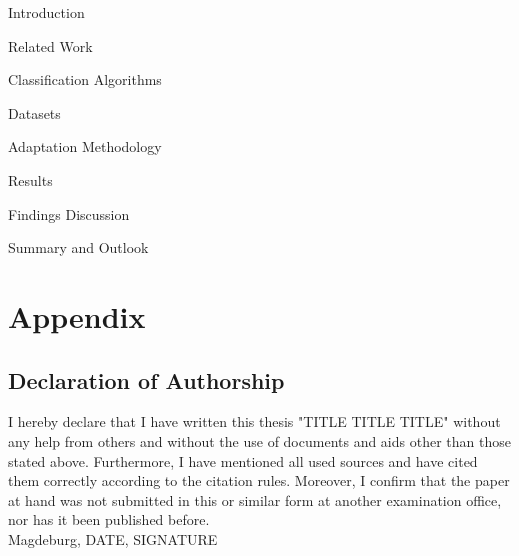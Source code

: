 \renewcommand*\contentsname{Table of Contents}
\tableofcontents
\thispagestyle{empty}
 
 \null\newpage
{} 






\thispagestyle{empty}
\null\newpage
{}
{Introduction}
\null\newpage

{Related Work}
\null\newpage

{Classification Algorithms}
\null\newpage

{Datasets}
\null\newpage

{Adaptation Methodology}
\null\newpage

{Results}
\null\newpage

{Findings Discussion}
\null\newpage

{Summary and Outlook}

\chapter*{Appendix}

\null\newpage

% 
\printbibliography
\newpage

\section{Declaration of Authorship}
I hereby declare that I have written this thesis "TITLE TITLE TITLE"
without any help from others and without the use of documents and aids
other than those stated above. Furthermore, I have mentioned all used
sources and have cited them correctly according to the citation rules.
Moreover, I confirm that the paper at hand was not submitted in this or
similar form at another examination office, nor has it been published
before.
\\
Magdeburg, DATE, SIGNATURE